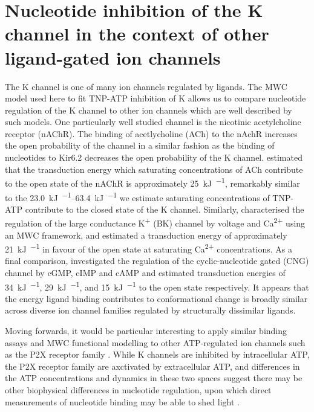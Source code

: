 \section{Nucleotide inhibition of the K\ATP{} channel in the context of other ligand-gated ion channels}

The K\ATP{} channel is one of many ion channels regulated by ligands.
The MWC model used here to fit TNP-ATP inhibition of K\ATP{} allows us to compare nucleotide regulation of the K\ATP{} channel to other ion channels which are well described by such models.
One particularly well studied channel is the nicotinic acetylcholine receptor (nAChR).
The binding of acetlycholine (ACh) to the nAchR increases the open probability of the channel in a similar fashion as the binding of nucleotides to Kir6.2 decreases the open probability of the K\ATP{} channel.
\textcite{auerbach_thinking_2012} estimated that the transduction energy which saturating concentrations of ACh contribute to the open state of the nAChR is approximately \SI{25}{\kilo\joule\per\Molar}, remarkably similar to the \SIrange{23.0}{63.4}{\kilo\joule\per\Molar} we estimate saturating concentrations of TNP-ATP contribute to the closed state of the K\ATP{} channel.
Similarly, \textcite{horrigan_coupling_2002} characterised the regulation of the large conductance K\textsuperscript{+} (BK) channel by voltage and Ca\textsuperscript{2+} using an MWC framework, and estimated a transduction energy of approximately \SI{21}{\kilo\joule\per\Molar} in favour of the open state at saturating Ca\textsuperscript{2+} concentrations.
As a final comparison, \textcite{varnum_subunit_1996} investigated the regulation of the cyclic-nucleotide gated (CNG) channel by cGMP, cIMP and cAMP and estimated transduction energies of \SI{34}{\kilo\joule\per\Molar}, \SI{29}{\kilo\joule\per\Molar}, and \SI{15}{\kilo\joule\per\Molar} to the open state respectively.
It appears that the energy ligand binding contributes to conformational change is broadly similar across diverse ion channel families regulated by structurally dissimilar ligands.

Moving forwards, it would be particular interesting to apply similar binding assays and MWC functional modelling to other ATP-regulated ion channels such as the P2X receptor family \cite{khakh_p2x_2006}.
While K\ATP{} channels are inhibited by intracellular ATP, the P2X receptor family are axctivated by extracellular ATP, and differences in the ATP concentrations and dynamics in these two spaces suggest there may be other biophysical differences in nucleotide regulation, upon which direct measurements of nucleotide binding may be able to shed light \cite{mansoor_x-ray_2016}.
